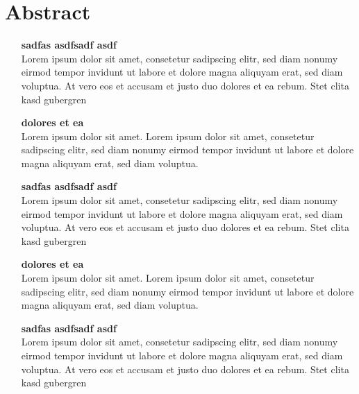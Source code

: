 \chapter*{Abstract}
\thispagestyle{empty}

\begin{itemize}

\item[\textsf{\textbf{\large sadfas asdfsadf asdf}}] \quad \\
Lorem ipsum dolor sit amet, consetetur sadipscing elitr, sed diam nonumy eirmod tempor invidunt ut labore et dolore magna aliquyam erat, sed diam voluptua. At vero eos et accusam et justo duo dolores et ea rebum. Stet clita kasd gubergren

\item[\textsf{\textbf{\large dolores et ea}}] \quad \\
Lorem ipsum dolor sit amet. Lorem ipsum dolor sit amet, consetetur sadipscing elitr, sed diam nonumy eirmod tempor invidunt ut labore et dolore magna aliquyam erat, sed diam voluptua.

\item[\textsf{\textbf{\large sadfas asdfsadf asdf}}] \quad \\
Lorem ipsum dolor sit amet, consetetur sadipscing elitr, sed diam nonumy eirmod tempor invidunt ut labore et dolore magna aliquyam erat, sed diam voluptua. At vero eos et accusam et justo duo dolores et ea rebum. Stet clita kasd gubergren

\item[\textsf{\textbf{\large dolores et ea}}] \quad \\
Lorem ipsum dolor sit amet. Lorem ipsum dolor sit amet, consetetur sadipscing elitr, sed diam nonumy eirmod tempor invidunt ut labore et dolore magna aliquyam erat, sed diam voluptua.

\item[\textsf{\textbf{\large sadfas asdfsadf asdf}}] \quad \\
Lorem ipsum dolor sit amet, consetetur sadipscing elitr, sed diam nonumy eirmod tempor invidunt ut labore et dolore magna aliquyam erat, sed diam voluptua. At vero eos et accusam et justo duo dolores et ea rebum. Stet clita kasd gubergren

\end{itemize}


\newpage								
\thispagestyle{empty}
\mbox{}